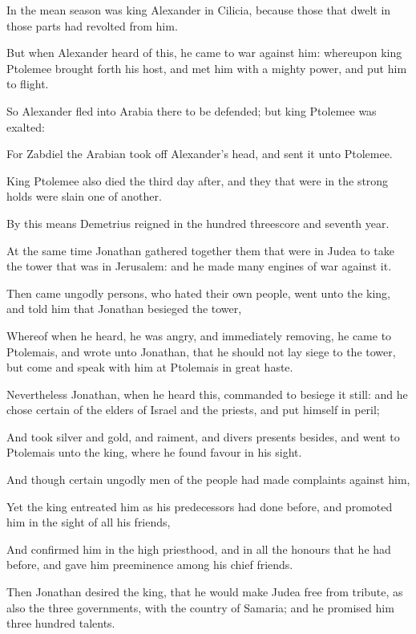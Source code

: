 {\par }{\PP {}In the mean season was king Alexander in Cilicia, because those that dwelt in those parts had revolted from him.
\par }{\PP {}But when Alexander heard of this, he came to war against him: whereupon king Ptolemee brought forth his host, and met him with a mighty power, and put him to flight.
\par }{\PP {}So Alexander fled into Arabia there to be defended; but king Ptolemee was exalted:
\par }{\PP {}For Zabdiel the Arabian took off Alexander’s head, and sent it unto Ptolemee.
\par }{\PP {}King Ptolemee also died the third day after, and they that were in the strong holds were slain one of another.
\par }{\PP {}By this means Demetrius reigned in the hundred threescore and seventh year.
\par }{\PP {}At the same time Jonathan gathered together them that were in Judea to take the tower that was in Jerusalem: and he made many engines of war against it.
\par }{\PP {}Then came ungodly persons, who hated their own people, went unto the king, and told him that Jonathan besieged the tower,
\par }{\PP {}Whereof when he heard, he was angry, and immediately removing, he came to Ptolemais, and wrote unto Jonathan, that he should not lay siege to the tower, but come and speak with him at Ptolemais in great haste.
\par }{\PP {}Nevertheless Jonathan, when he heard this, commanded to besiege it still: and he chose certain of the elders of Israel and the priests, and put himself in peril;
\par }{\PP {}And took silver and gold, and raiment, and divers presents besides, and went to Ptolemais unto the king, where he found favour in his sight.
\par }{\PP {}And though certain ungodly men of the people had made complaints against him,
\par }{\PP {}Yet the king entreated him as his predecessors had done before, and promoted him in the sight of all his friends,
\par }{\PP {}And confirmed him in the high priesthood, and in all the honours that he had before, and gave him preeminence among his chief friends.
\par }{\PP {}Then Jonathan desired the king, that he would make Judea free from tribute, as also the three governments, with the country of Samaria; and he promised him three hundred talents.
}

